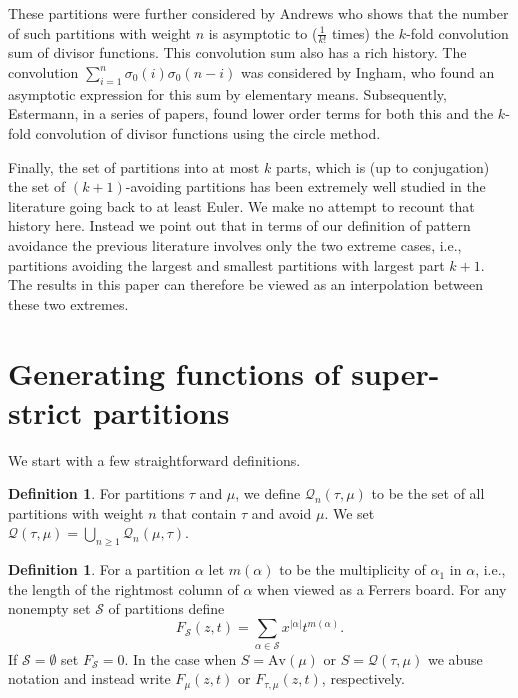 \documentclass{article}
\theoremstyle{plain}
\theoremstyle{definition}
\newtheorem{definition}[theorem]{Definition}
\newcommand{\Av}{\text{Av}}
\newcommand{\Q}{\mathcal{Q}}
\renewcommand{\S}{\mathcal{S}}
\begin{document}
These partitions were further considered by Andrews \cite{AndrewsSLB} who shows that the number of such partitions with weight $n$ is asymptotic to ($\frac{1}{k!}$ times) the $k$-fold convolution sum of divisor functions.  This convolution sum also has a rich history.  The convolution $\sum_{i=1}^n \sigma_0(i)\sigma_0(n-i)$ was considered by Ingham, who found an asymptotic expression for this sum by elementary means.  Subsequently, Estermann, in a series of papers, found lower order terms for both this and the $k$-fold convolution of divisor functions using the circle method.  

Finally, the set of partitions into at most $k$ parts, which is (up to conjugation) the set of $(k+1)$-avoiding partitions has been extremely well studied in the literature going back to at least Euler. We make no attempt to recount that history here.  Instead we point out that in terms of our definition of pattern avoidance the previous literature involves only the two extreme cases, i.e., partitions avoiding the largest and smallest partitions with largest part $k+1$.  The results in this paper can therefore be viewed as an interpolation between these two extremes.  





\section{Generating functions of super-strict partitions}\label{sec:rational}


We start with a few straightforward definitions. 
\begin{definition}
For partitions $\tau$ and $\mu$, we define $\Q_n(\tau,\mu)$ to be the set of all partitions with weight $n$ that contain $\tau$ and avoid $\mu$. We set $\Q(\tau,\mu) = \bigcup_{n\geq 1} \Q_n(\mu,\tau)$.
\end{definition}


\begin{definition}
For a partition $\alpha$ let $m(\alpha)$ to be the multiplicity of $\alpha_1$ in $\alpha$, i.e., the length of the rightmost column of $\alpha$ when viewed as a Ferrers board. For any nonempty set  $\S$ of partitions define 
$$F_{\S}(z,t) = \sum_{\alpha\in \S} x^{|\alpha|}t^{m(\alpha)}.$$
If $\S=\emptyset$ set $F_\S = 0$.  In the case when $S = \Av(\mu)$ or $S = \Q(\tau,\mu)$ we abuse notation and instead write $F_\mu(z,t)$ or $F_{\tau,\mu}(z,t)$, respectively.  	
\end{definition}
\end{document}
